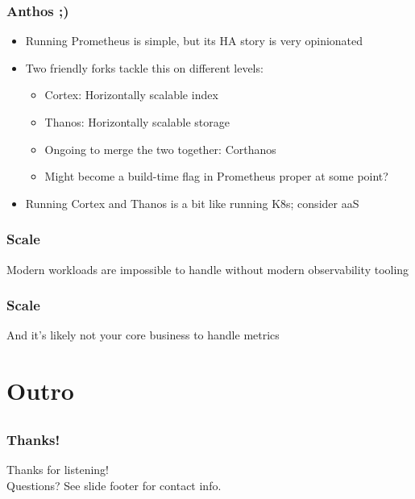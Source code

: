 \documentclass[aspectratio=169]{beamer}
\begin{document}
\begin{frame}
	\frametitle{Anthos ;)}
	\begin{itemize}
		\item Running Prometheus is simple, but its HA story is very opinionated
		\item Two friendly forks tackle this on different levels:
		\begin{itemize}
			\item Cortex: Horizontally scalable index
			\item Thanos: Horizontally scalable storage
			\item Ongoing to merge the two together: Corthanos
			\item Might become a build-time flag in Prometheus proper at some point?
		\end{itemize}
		\item Running Cortex and Thanos is a bit like running K8s; consider aaS
	\end{itemize}
\end{frame}

\begin{frame}
	\frametitle{Scale}
	\vfill
	Modern workloads are impossible to handle without modern observability tooling
	\vfill
\end{frame}

\begin{frame}
	\frametitle{Scale}
	\vfill
	And it's likely not your core business to handle metrics
	\vfill
\end{frame}



\section{Outro}


\subsection{}

\begin{frame}
	\frametitle{Thanks!}
		\begin{center}
			\vfill
			Thanks for listening!\\
			\vfill
			Questions?
			\vfill
			See slide footer for contact info.
			\vfill
		\end{center}
\end{frame}
\end{document}
